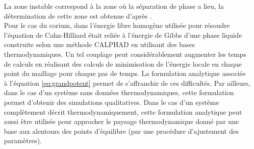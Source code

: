 
La zone instable correspond à la zone où la séparation de phase a lieu, la détermination de cette zone est obtenue d'après \cite{aursand_spinodal_2017}. \\
Pour le cas du corium, dans \cite{cardon_modelisation_2016} l'énergie libre homogène utilisée pour résoudre l'équation de Cahn-Hilliard était reliée à l'énergie de Gibbs d'une phase liquide construite selon une méthode CALPHAD en utilisant des bases thermodynamiques. Un tel couplage peut considérablement augmenter les temps de calculs en réalisant des calculs de minimisation de l'énergie locale en chaque point du maillage pour chaque pas de temps. La formulation analytique associée à l'équation \ref{eq:grandpotent} permet de s'affranchir de ces difficultés. Par ailleurs, dans le cas d’un système sans données thermodynamiques, cette formulation permet d’obtenir des simulations qualitatives. Dans le cas d’un système complètement décrit thermodynamiquement, cette formulation analytique peut aussi être utilisée pour approcher le paysage thermodynamique donné par une base aux alentours des points d'équilibre \cite{verdier_phase-field_2022} (par une procédure d'ajustement des paramètres).


